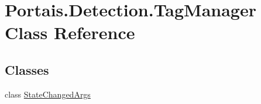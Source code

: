 \hypertarget{class_portais_1_1_detection_1_1_tag_manager}{}\section{Portais.\+Detection.\+Tag\+Manager Class Reference}
\label{class_portais_1_1_detection_1_1_tag_manager}
\subsection*{Classes}
\begin{DoxyCompactItemize}
\item 
class \hyperlink{class_portais_1_1_detection_1_1_tag_manager_1_1_state_changed_args}{State\+Changed\+Args}
\end{DoxyCompactItemize}
